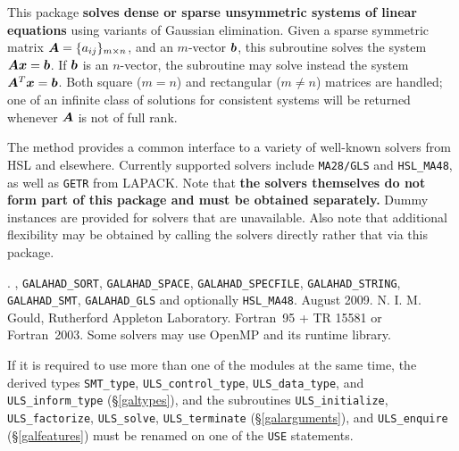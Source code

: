 \documentclass{galahad}
\newcommand{\packagename}{ULS}
\newcommand{\fullpackagename}{\libraryname\_\-\packagename}
\begin{document}
\galheader


\galsummary

This package
{\bf solves dense or sparse unsymmetric systems of linear equations}
using variants of Gaussian elimination.
Given a sparse symmetric matrix ${\bm{A}} = \{ a_{ij} \}_{m \times n}$, and an
$m$-vector ${\bm{b}}$, this subroutine solves the system ${\bm{A}} {\bm{x}} = {\bm{b}}$.
If ${\bm{b}}$ is an $n$-vector, the subroutine may solve instead the system 
${\bm{A}}^T {\bm{x}} = {\bm{b}}$. Both square ($m=n$) and
rectangular ($m\neq n$)  matrices are handled; one of an infinite
class of  solutions for consistent systems will be returned
whenever ${\bm{A}}$ is not of full rank.

\noindent The method provides a common interface to a variety of well-known
solvers from HSL and elsewhere.
Currently supported solvers include
{\tt MA28/GLS} and {\tt HSL\_MA48},
as well as {\tt GETR} from LAPACK.
Note that
{\bf the solvers themselves do not form part of this package and must be obtained
separately.} Dummy instances are provided for solvers that are unavailable.
Also note that additional flexibility may be obtained by calling the
solvers directly rather that via this package.


\galattributes
\galversions{\tt  \fullpackagename\_single, \fullpackagename\_double}.
,
{\tt GALAHAD\_\-SORT},
{\tt GALAHAD\_SPACE},
{\tt GALAHAD\_SPECFILE},
{\tt GALAHAD\_STRING},
{\tt GALAHAD\_SMT},
{\tt GALAHAD\_GLS}
and optionally
{\tt HSL\_\-MA48}.
\galdate August 2009.
\galorigin N. I. M. Gould, Rutherford Appleton Laboratory.
\gallanguage Fortran~95 + TR 15581 or Fortran~2003.
\galparallelism Some solvers may use OpenMP and its runtime library.


\galhowto



\noindent
If it is required to use more than one of the modules at the same time, 
the derived types
{\tt SMT\_type},
{\tt \packagename\_control\_type},
{\tt \packagename\_data\-\_type}, and
{\tt \packagename\_inform\_type}
(\S\ref{galtypes}),
and the subroutines
{\tt \packagename\_initialize},
{\tt \packagename\_factorize},
{\tt \packagename\_solve},
{\tt \packagename\_terminate}
(\S\ref{galarguments}),
and
{\tt \packagename\_enquire}
(\S\ref{galfeatures})
must be renamed on one of the {\tt USE} statements.
\end{document}
